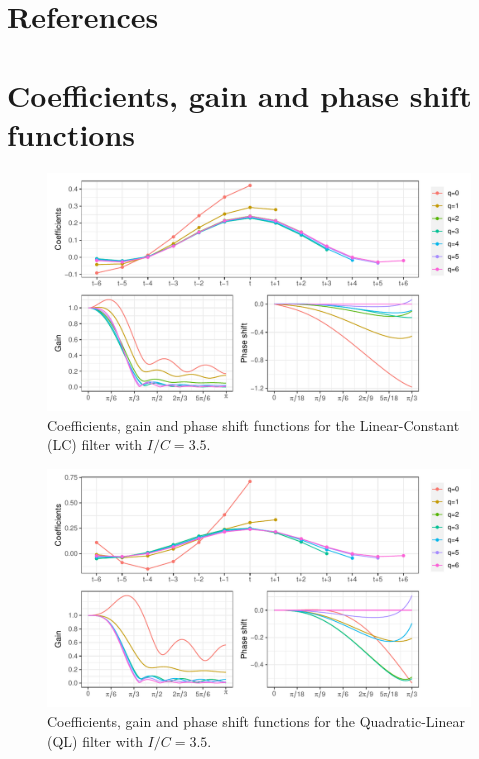 \documentclass[
]{article}
\newcommand\1{\mathds{1}}
\begin{document}
\newpage

\hypertarget{references}{%
\section*{References}\label{references}}

\printbibliography[heading=none]

\appendix
\newpage

\hypertarget{sec-an-cof}{%
\section{Coefficients, gain and phase shift
functions}\label{sec-an-cof}}

\begin{figure}[H]

\caption{\label{fig-graphs-coef-lc}Coefficients, gain and phase shift
functions for the Linear-Constant (LC) filter with \(I/C=3.5\).}

{\centering \includegraphics[width=1\textwidth,height=\textheight]{img/filters_used/lc.pdf}

}

\end{figure}

\begin{figure}[H]

\caption{\label{fig-graphs-coef-ql}Coefficients, gain and phase shift
functions for the Quadratic-Linear (QL) filter with \(I/C=3.5\).}

{\centering \includegraphics[width=1\textwidth,height=\textheight]{img/filters_used/ql.pdf}

}

\end{figure}
\end{document}
